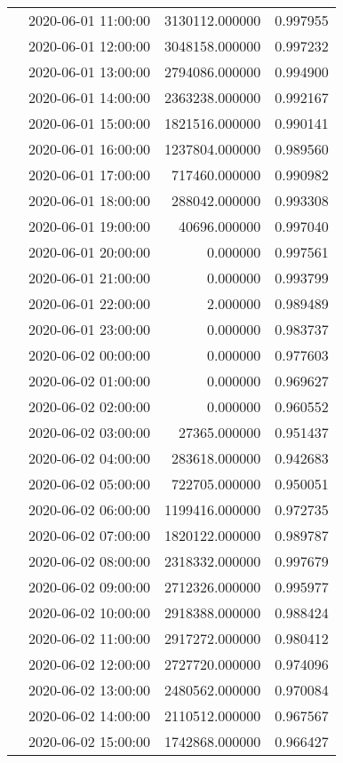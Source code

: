 \begin{tabular}{llrr}
 & 2020-06-01 11:00:00 & 3130112.000000 & 0.997955 \\
 & 2020-06-01 12:00:00 & 3048158.000000 & 0.997232 \\
 & 2020-06-01 13:00:00 & 2794086.000000 & 0.994900 \\
 & 2020-06-01 14:00:00 & 2363238.000000 & 0.992167 \\
 & 2020-06-01 15:00:00 & 1821516.000000 & 0.990141 \\
 & 2020-06-01 16:00:00 & 1237804.000000 & 0.989560 \\
 & 2020-06-01 17:00:00 & 717460.000000 & 0.990982 \\
 & 2020-06-01 18:00:00 & 288042.000000 & 0.993308 \\
 & 2020-06-01 19:00:00 & 40696.000000 & 0.997040 \\
 & 2020-06-01 20:00:00 & 0.000000 & 0.997561 \\
 & 2020-06-01 21:00:00 & 0.000000 & 0.993799 \\
 & 2020-06-01 22:00:00 & 2.000000 & 0.989489 \\
 & 2020-06-01 23:00:00 & 0.000000 & 0.983737 \\
 & 2020-06-02 00:00:00 & 0.000000 & 0.977603 \\
 & 2020-06-02 01:00:00 & 0.000000 & 0.969627 \\
 & 2020-06-02 02:00:00 & 0.000000 & 0.960552 \\
 & 2020-06-02 03:00:00 & 27365.000000 & 0.951437 \\
 & 2020-06-02 04:00:00 & 283618.000000 & 0.942683 \\
 & 2020-06-02 05:00:00 & 722705.000000 & 0.950051 \\
 & 2020-06-02 06:00:00 & 1199416.000000 & 0.972735 \\
 & 2020-06-02 07:00:00 & 1820122.000000 & 0.989787 \\
 & 2020-06-02 08:00:00 & 2318332.000000 & 0.997679 \\
 & 2020-06-02 09:00:00 & 2712326.000000 & 0.995977 \\
 & 2020-06-02 10:00:00 & 2918388.000000 & 0.988424 \\
 & 2020-06-02 11:00:00 & 2917272.000000 & 0.980412 \\
 & 2020-06-02 12:00:00 & 2727720.000000 & 0.974096 \\
 & 2020-06-02 13:00:00 & 2480562.000000 & 0.970084 \\
 & 2020-06-02 14:00:00 & 2110512.000000 & 0.967567 \\
 & 2020-06-02 15:00:00 & 1742868.000000 & 0.966427 \\

\end{tabular}
